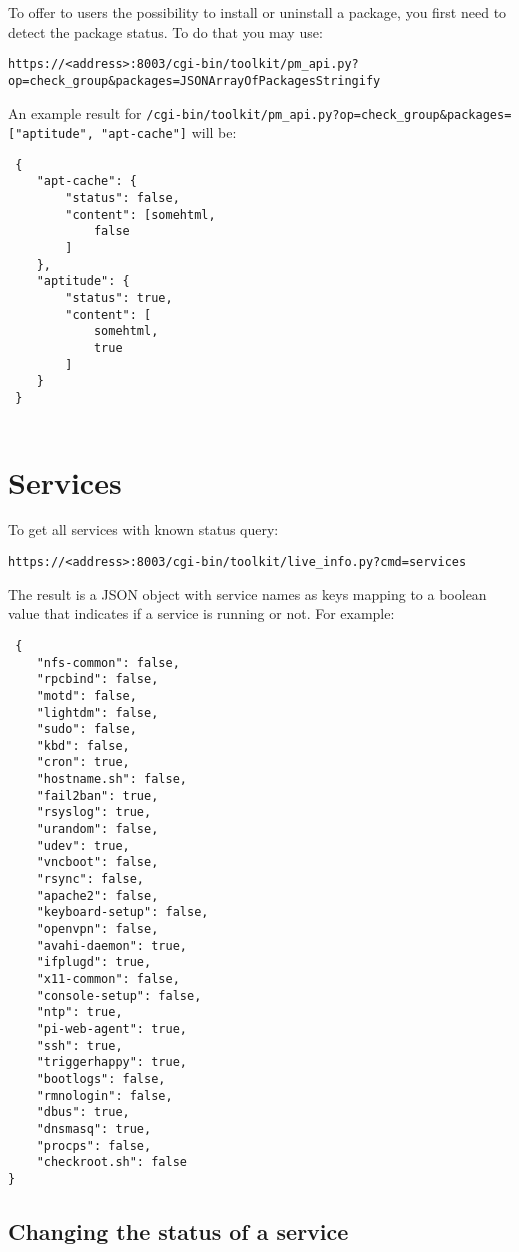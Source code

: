 \documentclass[12pt]{article}
\begin{document}
 To offer to users the possibility to install or uninstall a package, you first need to detect the package status. To do that you may use:
 
 \texttt{https://<address>:8003/cgi-bin/toolkit/pm\_api.py?op=check\_group\&packages=JSONArrayOfPackagesStringify}
 

 An example result for \texttt{/cgi-bin/toolkit/pm\_api.py?op=check\_group\&packages=["aptitude", "apt-cache"]} will be:
 
 \begin{verbatim}
 {
    "apt-cache": {
        "status": false,
        "content": [somehtml,
            false
        ]
    },
    "aptitude": {
        "status": true,
        "content": [
            somehtml,
            true
        ]
    }
 }
 
\end{verbatim}
 
 
 \section{Services}
 To get all services with known status query:
 
 
 \texttt{https://<address>:8003/cgi-bin/toolkit/live\_info.py?cmd=services}
 
 The result is a JSON object with service names as keys mapping to a boolean value that indicates if a service is running or not. For example:
 
 \begin{verbatim}
 {
    "nfs-common": false,
    "rpcbind": false,
    "motd": false,
    "lightdm": false,
    "sudo": false,
    "kbd": false,
    "cron": true,
    "hostname.sh": false,
    "fail2ban": true,
    "rsyslog": true,
    "urandom": false,
    "udev": true,
    "vncboot": false,
    "rsync": false,
    "apache2": false,
    "keyboard-setup": false,
    "openvpn": false,
    "avahi-daemon": true,
    "ifplugd": true,
    "x11-common": false,
    "console-setup": false,
    "ntp": true,
    "pi-web-agent": true,
    "ssh": true,
    "triggerhappy": true,
    "bootlogs": false,
    "rmnologin": false,
    "dbus": true,
    "dnsmasq": true,
    "procps": false,
    "checkroot.sh": false
}
 \end{verbatim}
 
 \subsection{Changing the status of a service}
 
\end{document}
